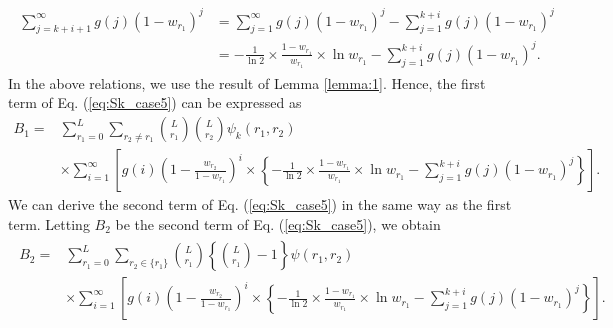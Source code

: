\begin{align}\begin{split}
  \sum_{j=k+i+1}^{\infty} g(j) (1-w_{r_1})^j 
  &= \sum_{j=1}^{\infty} g(j)(1-w_{r_1})^{j} - \sum_{j=1}^{k+i} g(j)(1-w_{r_1})^{j} \\
  &= -\frac{1}{\ln 2} \times \frac{1-w_{r_1}}{w_{r_1}} \times \ln w_{r_1} - \sum_{j=1}^{k+i} g(j)(1-w_{r_1})^{j}.
\end{split}\end{align}
In the above relations, we use the result of Lemma \ref{lemma:1}.
Hence, the first term of Eq. (\ref{eq:Sk_case5}) can be expressed as
\begin{align}
  B_1 
  =& \sum_{r_1=0}^{L} \sum_{r_2 \neq r_1} \binom{L}{r_1}\binom{L}{r_2}\psi_k(r_1,r_2)\\
  &\times\sum_{i=1}^{\infty} \left[ g(i) \left(1-\frac{w_{r_2}}{1-w_{r_1}} \right)^{i} \times \left\{ -\frac{1}{\ln 2} \times \frac{1-w_{r_1}}{w_{r_1}} \times \ln w_{r_1} - \sum_{j=1}^{k+i} g(j)(1-w_{r_1})^{j} \right\} \right].
\end{align}
We can derive the second term of Eq. (\ref{eq:Sk_case5}) in the same way as the first term. Letting $B_2$ be the second term of Eq. (\ref{eq:Sk_case5}), we obtain
\begin{align}\begin{split}
  B_2 =& \sum_{r_1=0}^{L} \sum_{r_2 \in \{r_1\}} \binom{L}{r_1}\left\{\binom{L}{r_1}-1\right\} \psi(r_1,r_2) \\
  &\times\sum_{i=1}^{\infty} \left[ g(i) \left(1-\frac{w_{r_2}}{1-w_{r_1}} \right)^{i} \times \left\{ -\frac{1}{\ln 2} \times \frac{1-w_{r_1}}{w_{r_1}} \times \ln w_{r_1} - \sum_{j=1}^{k+i} g(j)(1-w_{r_1})^{j} \right\} \right].
\end{split}\end{align}
